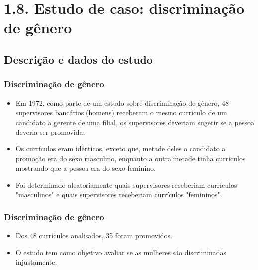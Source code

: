 \section{1.8. Estudo de caso: discriminação de gênero}


\subsection{Descrição e dados do estudo}


\begin{frame}
\frametitle{Discriminação de gênero}

\begin{itemize}
\justifying
\item Em 1972, como parte de um estudo sobre discriminação de gênero, 48 supervisores bancários (homens) receberam o mesmo currículo de um candidato a gerente de uma filial, os supervisores deveriam sugerir se a pessoa deveria ser promovida. 
\justifying
\item Os currículos eram idênticos, exceto que, metade deles o candidato a promoção era do sexo masculino, enquanto a outra metade tinha currículos mostrando que a pessoa era do sexo feminino.
\justifying
\item Foi determinado aleatoriamente quais supervisores receberiam currículos "masculinos" e quais supervisores receberiam currículos "femininos".  
\end{itemize}
\end{frame}

\begin{frame}
\frametitle{Discriminação de gênero}

\begin{itemize}
\justifying
\item Dos 48 currículos analisados, 35 foram promovidos. 
\justifying
\item O estudo tem como objetivo avaliar se as mulheres são discriminadas injustamente.  
\end{itemize}
\justifying
{} 
\justifying
{}

\end{frame}


